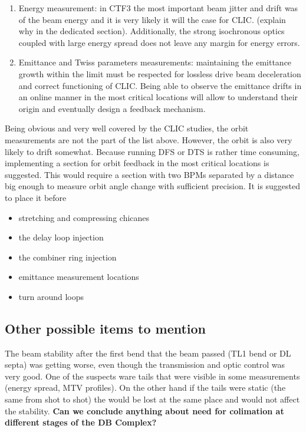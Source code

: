 \begin{enumerate}
\item Energy measurement: in CTF3 the most important beam jitter and drift was of the beam energy and 
      it is very likely it will the case for CLIC. (explain why in the dedicated section). 
      Additionally, the strong isochronous optics coupled with large energy spread 
      does not leave any margin for energy errors.

\item Emittance and Twiss parameters measurements: maintaining the emittance growth within the limit 
      must be respected for lossless drive beam deceleration and correct functioning of CLIC.
      Being able to observe the emittance drifts in an online manner in the most critical locations
      will allow to understand their origin and eventually design a feedback mechanism. 
      
\end{enumerate}

	
Being obvious and very well covered by the CLIC studies, the orbit measurements are not the part of the list above.
However, the orbit is also very likely to drift somewhat. 
Because running DFS or DTS is rather time consuming, implementing a section for orbit feedback 
in the most critical locations is suggested. This would require a section with 
two BPMs separated by a distance big enough to measure orbit angle change with sufficient precision.
It is suggested to place it before
\begin{itemize}
\item stretching and compressing chicanes
\item the delay loop injection
\item the combiner ring injection
\item emittance measurement locations
\item turn around loops
\end{itemize}


\subsection{Other possible items to mention}

The beam stability after the first bend that the beam passed (TL1 bend or DL septa) was getting worse,
even though the transmission and optic control was very good.
One of the suspects ware tails that were visible in some measurements (energy spread, MTV profiles).
On the other hand if the tails were static (the same from shot to shot) the would be lost at the same place 
and would not affect the stability. \textbf{Can we conclude anything about need for colimation at different stages of the DB Complex?}
